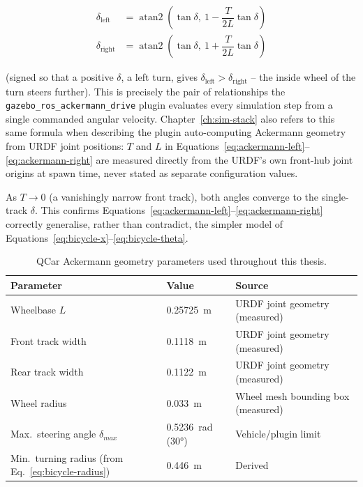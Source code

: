 \begin{align}
  \delta_{\text{left}} &= \operatorname{atan2}\!\left(\tan\delta,\ 1 - \dfrac{T}{2L}\tan\delta\right) \label{eq:ackermann-left}\\
  \delta_{\text{right}} &= \operatorname{atan2}\!\left(\tan\delta,\ 1 + \dfrac{T}{2L}\tan\delta\right) \label{eq:ackermann-right}
\end{align}

(signed so that a positive $\delta$, a left turn, gives
$\delta_{\text{left}} > \delta_{\text{right}}$ -- the inside wheel of
the turn steers further). This is precisely the pair of relationships
the \texttt{gazebo\_ros\_ackermann\_drive} plugin evaluates every
simulation step from a single commanded angular velocity.
Chapter~\ref{ch:sim-stack} also refers to this same formula when
describing the plugin auto-computing Ackermann geometry from URDF
joint positions:
$T$ and $L$ in Equations~\ref{eq:ackermann-left}--\ref{eq:ackermann-right}
are measured directly from the URDF's own front-hub joint origins at
spawn time, never stated as separate configuration values.

As $T \to 0$ (a vanishingly narrow front track), both angles converge
to the single-track $\delta$. This confirms
Equations~\ref{eq:ackermann-left}--\ref{eq:ackermann-right} correctly
generalise, rather than contradict, the simpler model of
Equations~\ref{eq:bicycle-x}--\ref{eq:bicycle-theta}.

\begin{table}[htbp]
  \centering
  \caption{QCar Ackermann geometry parameters used throughout this thesis.}
  \label{tab:qcar-geometry}
  \begin{tabular}{@{}lll@{}}
    \toprule
    Parameter & Value & Source \\
    \midrule
    Wheelbase $L$ & \SI{0.25725}{\meter} & URDF joint geometry (measured) \\
    Front track width & \SI{0.1118}{\meter} & URDF joint geometry (measured) \\
    Rear track width & \SI{0.1122}{\meter} & URDF joint geometry (measured) \\
    Wheel radius & \SI{0.033}{\meter} & Wheel mesh bounding box (measured) \\
    Max.\ steering angle $\delta_{max}$ & \SI{0.5236}{\radian} (\ang{30}) & Vehicle/plugin limit \\
    Min.\ turning radius (from Eq.~\ref{eq:bicycle-radius}) & \SI{0.446}{\meter} & Derived \\
    \bottomrule
  \end{tabular}
\end{table}

